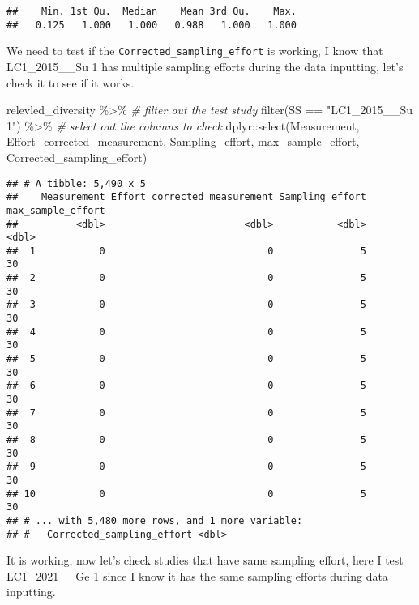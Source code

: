 \documentclass[
]{article}
\newenvironment{Shaded}{\begin{snugshade}}{\end{snugshade}}
\newcommand{\CommentTok}[1]{\textcolor[rgb]{0.56,0.35,0.01}{\textit{#1}}}
\newcommand{\FunctionTok}[1]{\textcolor[rgb]{0.00,0.00,0.00}{#1}}
\newcommand{\NormalTok}[1]{#1}
\newcommand{\SpecialCharTok}[1]{\textcolor[rgb]{0.00,0.00,0.00}{#1}}
\newcommand{\StringTok}[1]{\textcolor[rgb]{0.31,0.60,0.02}{#1}}
\begin{document}
\begin{verbatim}
##    Min. 1st Qu.  Median    Mean 3rd Qu.    Max. 
##   0.125   1.000   1.000   0.988   1.000   1.000
\end{verbatim}

We need to test if the \texttt{Corrected\_sampling\_effort} is working,
I know that LC1\_2015\_\_Su 1 has multiple sampling efforts during the
data inputting, let's check it to see if it works.

\begin{Shaded}
\begin{Highlighting}[]
\NormalTok{relevled\_diversity }\SpecialCharTok{\%\textgreater{}\%} 
  \CommentTok{\# filter out the test study}
  \FunctionTok{filter}\NormalTok{(SS }\SpecialCharTok{==} \StringTok{"LC1\_2015\_\_Su 1"}\NormalTok{) }\SpecialCharTok{\%\textgreater{}\%} 
  \CommentTok{\# select out the columns to check}
\NormalTok{  dplyr}\SpecialCharTok{::}\FunctionTok{select}\NormalTok{(Measurement, Effort\_corrected\_measurement, Sampling\_effort, max\_sample\_effort, Corrected\_sampling\_effort)}
\end{Highlighting}
\end{Shaded}

\begin{verbatim}
## # A tibble: 5,490 x 5
##    Measurement Effort_corrected_measurement Sampling_effort max_sample_effort
##          <dbl>                        <dbl>           <dbl>             <dbl>
##  1           0                            0               5                30
##  2           0                            0               5                30
##  3           0                            0               5                30
##  4           0                            0               5                30
##  5           0                            0               5                30
##  6           0                            0               5                30
##  7           0                            0               5                30
##  8           0                            0               5                30
##  9           0                            0               5                30
## 10           0                            0               5                30
## # ... with 5,480 more rows, and 1 more variable:
## #   Corrected_sampling_effort <dbl>
\end{verbatim}

It is working, now let's check studies that have same sampling effort,
here I test LC1\_2021\_\_Ge 1 since I know it has the same sampling
efforts during data inputting.
\end{document}
